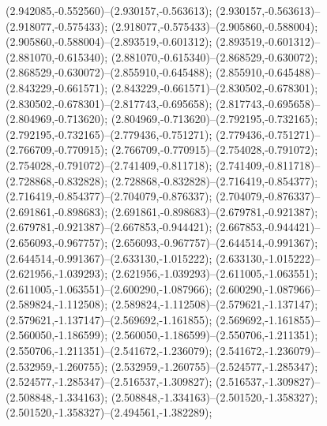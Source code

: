  (2.942085,-0.552560)--(2.930157,-0.563613);
 (2.930157,-0.563613)--(2.918077,-0.575433);
 (2.918077,-0.575433)--(2.905860,-0.588004);
 (2.905860,-0.588004)--(2.893519,-0.601312);
 (2.893519,-0.601312)--(2.881070,-0.615340);
 (2.881070,-0.615340)--(2.868529,-0.630072);
 (2.868529,-0.630072)--(2.855910,-0.645488);
 (2.855910,-0.645488)--(2.843229,-0.661571);
 (2.843229,-0.661571)--(2.830502,-0.678301);
 (2.830502,-0.678301)--(2.817743,-0.695658);
 (2.817743,-0.695658)--(2.804969,-0.713620);
 (2.804969,-0.713620)--(2.792195,-0.732165);
 (2.792195,-0.732165)--(2.779436,-0.751271);
 (2.779436,-0.751271)--(2.766709,-0.770915);
 (2.766709,-0.770915)--(2.754028,-0.791072);
 (2.754028,-0.791072)--(2.741409,-0.811718);
 (2.741409,-0.811718)--(2.728868,-0.832828);
 (2.728868,-0.832828)--(2.716419,-0.854377);
 (2.716419,-0.854377)--(2.704079,-0.876337);
 (2.704079,-0.876337)--(2.691861,-0.898683);
 (2.691861,-0.898683)--(2.679781,-0.921387);
 (2.679781,-0.921387)--(2.667853,-0.944421);
 (2.667853,-0.944421)--(2.656093,-0.967757);
 (2.656093,-0.967757)--(2.644514,-0.991367);
 (2.644514,-0.991367)--(2.633130,-1.015222);
 (2.633130,-1.015222)--(2.621956,-1.039293);
 (2.621956,-1.039293)--(2.611005,-1.063551);
 (2.611005,-1.063551)--(2.600290,-1.087966);
 (2.600290,-1.087966)--(2.589824,-1.112508);
 (2.589824,-1.112508)--(2.579621,-1.137147);
 (2.579621,-1.137147)--(2.569692,-1.161855);
 (2.569692,-1.161855)--(2.560050,-1.186599);
 (2.560050,-1.186599)--(2.550706,-1.211351);
 (2.550706,-1.211351)--(2.541672,-1.236079);
 (2.541672,-1.236079)--(2.532959,-1.260755);
 (2.532959,-1.260755)--(2.524577,-1.285347);
 (2.524577,-1.285347)--(2.516537,-1.309827);
 (2.516537,-1.309827)--(2.508848,-1.334163);
 (2.508848,-1.334163)--(2.501520,-1.358327);
 (2.501520,-1.358327)--(2.494561,-1.382289);
